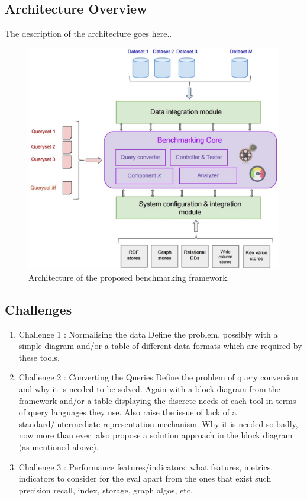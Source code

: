 \documentclass{llncs}
\newcommand{\todoinline}[1]{
    \todo[inline]{#1}
}
\begin{document}
    

    \subsection{Architecture Overview}
        The description of the architecture goes here.. 
        \begin{figure}[t]
            \centering
            \includegraphics[width=\textwidth]{images/benchmark_arch}
            \caption{Architecture of the proposed benchmarking framework.}
            \label{fig:benchmark_arch}
        \end{figure}
    
    \subsection{Challenges}
    \todoinline{pending}
        \begin{enumerate}
            \item Challenge 1 : Normalising the data
            Define the problem, possibly with a simple diagram and/or a table of different data formats which are required by these tools.
            \item Challenge 2 : Converting the Queries
            Define the problem of query conversion and why it is needed to be solved. Again with a block diagram from the framework and/or a table displaying the discrete needs of each tool in terms of query languages they use.
            Also raise the issue of lack of a standard/intermediate representation mechanism. Why it is needed so badly, now more than ever.
            also propose a solution approach in the block diagram (as mentioned above).
            \item Challenge 3 : Performance features/indicators: what features, metrics, indicators to consider for the eval apart from the ones that exist such precision recall, index, storage, graph algos, etc.
        \end{enumerate}
        
\end{document}
